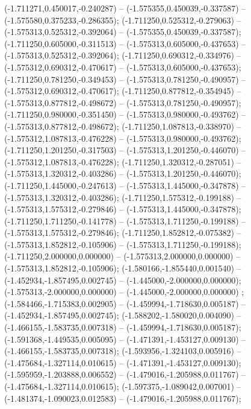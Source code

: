  (-1.711271,0.450017,-0.240287) -- (-1.575355,0.450039,-0.337587) -- (-1.575580,0.375233,-0.286355);
 (-1.711250,0.525312,-0.279063) -- (-1.575313,0.525312,-0.392064) -- (-1.575355,0.450039,-0.337587);
 (-1.711250,0.605000,-0.311513) -- (-1.575313,0.605000,-0.437653) -- (-1.575313,0.525312,-0.392064);
 (-1.711250,0.690312,-0.334976) -- (-1.575312,0.690312,-0.470617) -- (-1.575313,0.605000,-0.437653);
 (-1.711250,0.781250,-0.349453) -- (-1.575313,0.781250,-0.490957) -- (-1.575312,0.690312,-0.470617);
 (-1.711250,0.877812,-0.354945) -- (-1.575313,0.877812,-0.498672) -- (-1.575313,0.781250,-0.490957);
 (-1.711250,0.980000,-0.351450) -- (-1.575313,0.980000,-0.493762) -- (-1.575313,0.877812,-0.498672);
 (-1.711250,1.087813,-0.338970) -- (-1.575312,1.087813,-0.476228) -- (-1.575313,0.980000,-0.493762);
 (-1.711250,1.201250,-0.317503) -- (-1.575313,1.201250,-0.446070) -- (-1.575312,1.087813,-0.476228);
 (-1.711250,1.320312,-0.287051) -- (-1.575313,1.320312,-0.403286) -- (-1.575313,1.201250,-0.446070);
 (-1.711250,1.445000,-0.247613) -- (-1.575313,1.445000,-0.347878) -- (-1.575313,1.320312,-0.403286);
 (-1.711250,1.575312,-0.199188) -- (-1.575313,1.575312,-0.279846) -- (-1.575313,1.445000,-0.347878);
 (-1.711250,1.711250,-0.141778) -- (-1.575313,1.711250,-0.199188) -- (-1.575313,1.575312,-0.279846);
 (-1.711250,1.852812,-0.075382) -- (-1.575313,1.852812,-0.105906) -- (-1.575313,1.711250,-0.199188);
 (-1.711250,2.000000,0.000000) -- (-1.575313,2.000000,0.000000) -- (-1.575313,1.852812,-0.105906);
 (-1.580166,-1.855440,0.001540) -- (-1.452934,-1.857495,0.002745) -- (-1.445000,-2.000000,0.000000);
 (-1.575313,-2.000000,0.000000) -- (-1.445000,-2.000000,0.000000) ;
 (-1.584466,-1.715383,0.002905) -- (-1.459994,-1.718630,0.005187) -- (-1.452934,-1.857495,0.002745);
 (-1.588202,-1.580020,0.004090) -- (-1.466155,-1.583735,0.007318) -- (-1.459994,-1.718630,0.005187);
 (-1.591368,-1.449535,0.005095) -- (-1.471391,-1.453127,0.009130) -- (-1.466155,-1.583735,0.007318);
 (-1.593956,-1.324103,0.005916) -- (-1.475684,-1.327114,0.010615) -- (-1.471391,-1.453127,0.009130);
 (-1.595959,-1.203888,0.006552) -- (-1.479016,-1.205988,0.011767) -- (-1.475684,-1.327114,0.010615);
 (-1.597375,-1.089042,0.007001) -- (-1.481374,-1.090023,0.012583) -- (-1.479016,-1.205988,0.011767);
